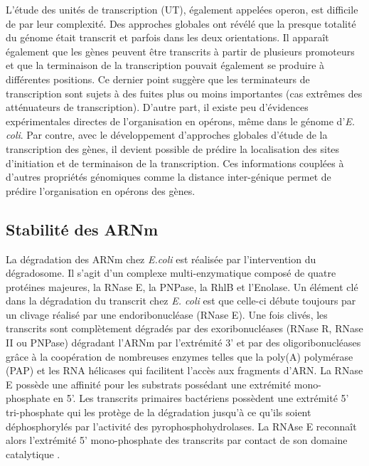 \documentclass[12pt,a4paper]{report}
\begin{document}
\begin{onehalfspace}
L'étude des unités de transcription (UT), également appelées \gls{operon}, est difficile de par leur complexité. Des approches globales ont révélé que la presque totalité du génome était transcrit et parfois dans les deux orientations. Il apparaît également que les gènes peuvent être transcrits à partir de plusieurs promoteurs et que la terminaison de la transcription pouvait également se produire à différentes positions. Ce dernier point suggère que les terminateurs de transcription sont sujets à des fuites plus ou moins importantes (cas extrêmes des atténuateurs de transcription). D'autre part, il existe peu d'évidences expérimentales directes de l'organisation en opérons, même dans le génome d'\textit{E. coli}. Par contre, avec le développement d'approches globales d'étude de la transcription des gènes, il devient possible de prédire la localisation des sites d'initiation et de terminaison de la transcription. Ces informations couplées à d'autres propriétés génomiques comme la distance inter-génique permet de prédire l'organisation en opérons des gènes.

\subsection*{Stabilité des ARNm}

La dégradation des ARNm chez \textit{E.coli} est réalisée par l'intervention du dégradosome. Il s'agit d'un complexe multi-enzymatique composé de quatre protéines majeures, la RNase E, la PNPase, la RhlB et l'Enolase. Un élément clé dans la dégradation du transcrit chez \textit{E. coli} est que celle-ci débute toujours par un clivage réalisé par une endoribonucléase (RNase E). Une fois clivés, les transcrits sont complètement dégradés par des exoribonucléases (RNase R, RNase II ou PNPase) dégradant l'ARNm par l'extrémité 3' et par des oligoribonucléases grâce à la coopération de nombreuses enzymes telles que la poly(A) polymérase (PAP) et les RNA hélicases qui facilitent l'accès aux fragments d'ARN. La RNase E possède une affinité pour les substrats possédant une extrémité mono-phosphate en 5'. Les transcrits primaires bactériens possèdent une extrémité 5' tri-phosphate qui les protège de la dégradation jusqu'à ce qu'ils soient déphosphorylés par l'activité des pyrophosphohydrolases. La RNAse E reconnaît alors l'extrémité 5' mono-phosphate des transcrits par contact de son domaine catalytique \citep{Callaghan2005,Bandyra2013}.


\end{onehalfspace}
\end{document}
